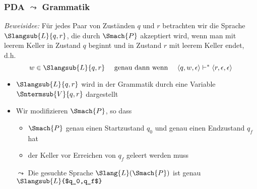 \documentclass[aspectratio=1610,onlymath]{beamer}
\begin{document}
\begin{frame}[t]\frametitle{PDA $\leadsto$ Grammatik}

\pause\bigskip

\emph{Beweisidee:}
Für jedes Paar von Zuständen $q$ und $r$ betrachten wir die Sprache
$\Slangsub{L}{q,r}$, die durch $\Smach{P}$ akzeptiert wird, wenn man mit leerem Keller in Zustand $q$ beginnt
und in Zustand $r$ \alert{mit leerem Keller} endet, d.h.
\[ w\in \Slangsub{L}{q,r} \quad\text{ genau dann wenn }\quad \tuple{q,w,\epsilon}\vdash^* \tuple{r,\epsilon,\epsilon}\]

\begin{itemize}
\item $\Slangsub{L}{q,r}$ wird in der Grammatik durch eine Variable $\Sntermsub{V}{q,r}$ dargestellt
\item Wir modifizieren $\Smach{P}$, so dass
\begin{itemize}
\item $\Smach{P}$ genau einen Startzustand $q_0$ und genau einen Endzustand $q_f$ hat
\item der Keller vor Erreichen von $q_f$ geleert werden muss
\end{itemize}
$\leadsto$ Die gesuchte Sprache $\Slang{L}(\Smach{P})$ ist genau $\Slangsub{L}{$q_0,q_f$}$
\end{itemize}

\end{frame}

\def\stackColA{darkred}
\def\stackColB{darkblue}
\def\stackColC{strongyellow}
\def\myRandomSeed{1851}

\newcommand{\drawStack}[4]{
\pgfmathsetseed{\myRandomSeed}
\foreach \i in {0,...,#1} {
	\ifthenelse{\i>0}{

	\pgfmathsetmacro\rnum{\i*random(17)}
	\pgfmathparse{(#4>0)?1:0}
	\ifthenelse{\pgfmathresult>0 \AND \i=#1 } {
		\pgfmathsetmacro\rnum{\rnum+#4)}
	}{}
	\pgfmathsetmacro\k{mod(\rnum,4)*33)}
	
	\pgfmathsetmacro\ir{random(4)}
	\pgfmathparse{(\ir>2)?1:0}
	\ifthenelse{\pgfmathresult=0}
	{
		\draw[fill=\stackColA!\k!\stackColC,line width=0.1mm] (#2,\l * #3 + \l * \i - \l) -- (#2+\l,\l * #3 + \l * \i - \l) -- (#2+\l,\l * #3 + \l * \i) -- (#2,\l * #3 + \l * \i) -- cycle;
	}{
		\draw[fill=\stackColB!\k!\stackColC,line width=0.1mm] (#2,\l * #3 + \l * \i - \l) -- (#2+\l,\l * #3 + \l * \i - \l) -- (#2+\l,\l * #3 + \l * \i) -- (#2,\l * #3 + \l * \i) -- cycle;
	}}{}
}
}
\end{document}
